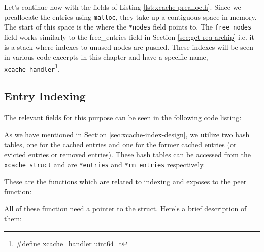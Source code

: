 Let's continue now with the fields of Listing \ref{lst:xcache-prealloc.h}. Since 
we preallocate the entries using \texttt{malloc}, they take up a contiguous 
space in memory.  The start of this space is the where the \texttt{*nodes} field 
points to. The \texttt{free\_nodes} field works similarly to the free\_entries 
field in Section \ref{sec:get-req-archip} i.e. it is a stack where indexes to 
unused nodes are pushed. These indexes will be seen in various code excerpts in 
this chapter and have a specific name, 
\texttt{xcache\_handler}\footnote{\#define xcache\_handler uint64\_t}.

\subsection{Entry Indexing}

The relevant fields for this purpose can be seen in the following code listing:


As we have mentioned in Section \ref{sec:xcache-index-design}, we utilize two 
hash tables, one for the cached entries and one for the former cached entries 
(or evicted entries or removed entries). These hash tables can be accessed from 
the \texttt{xcache struct} and are \texttt{*entries} and \texttt{*rm\_entries} 
respectively.

These are the functions which are related to indexing and \xcache exposes to the 
peer function:


All of these function need a pointer to the \xcache struct. Here's a brief 
description of them:

